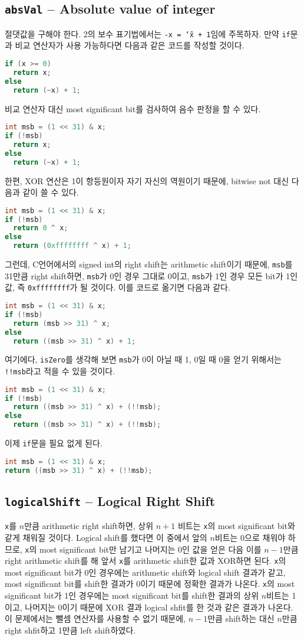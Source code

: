 \documentclass{scrartcl}
\begin{document}
\subsection{\texttt{absVal} -- Absolute value of integer}
절댓값을 구해야 한다. 2의 보수 표기법에서는 \texttt{-x = \char`\~x + 1}임에
주목하자. 만약 \texttt{if}문과 비교 연산자가 사용 가능하다면 다음과 같은 코드를 작성할
것이다.
\begin{lstlisting}[language=C]
if (x >= 0)
  return x;
else
  return (~x) + 1;
\end{lstlisting}
비교 연산자 대신 most significant bit를 검사하여 음수 판정을 할 수 있다.
\begin{lstlisting}[language=C]
int msb = (1 << 31) & x;
if (!msb)
  return x;
else
  return (~x) + 1;
\end{lstlisting}
한편, XOR 연산은 1이 항등원이자 자기 자신의 역원이기 때문에, bitwise not 대신
다음과 같이 쓸 수 있다.
\begin{lstlisting}[language=C]
int msb = (1 << 31) & x;
if (!msb)
  return 0 ^ x;
else
  return (0xffffffff ^ x) + 1;
\end{lstlisting}
그런데, C언어에서의 signed int의 right shift는 arithmetic shift이기 때문에,
\texttt{msb}를 31만큼 right shift하면, \texttt{msb}가 0인 경우 그대로 0이고,
\texttt{msb}가 1인 경우 모든 bit가 1인 값, 즉 \texttt{0xffffffff}가 될 것이다.
이를 코드로 옮기면 다음과 같다.
\begin{lstlisting}[language=C]
int msb = (1 << 31) & x;
if (!msb)
  return (msb >> 31) ^ x;
else
  return ((msb >> 31) ^ x) + 1;
\end{lstlisting}
여기에다, \texttt{isZero}를 생각해 보면 \texttt{msb}가 0이 아닐 때 1, 0일 때
0을 얻기 위해서는 \texttt{!!msb}라고 적을 수 있을 것이다.
\begin{lstlisting}[language=C]
int msb = (1 << 31) & x;
if (!msb)
  return ((msb >> 31) ^ x) + (!!msb);
else
  return ((msb >> 31) ^ x) + (!!msb);
\end{lstlisting}
이제 \texttt{if}문을 필요 없게 된다.
\begin{lstlisting}[language=C]
int msb = (1 << 31) & x;
return ((msb >> 31) ^ x) + (!!msb);
\end{lstlisting}

\subsection{\texttt{logicalShift} -- Logical Right Shift}
\texttt{x}를 \(n\)만큼 arithmetic right shift하면, 상위 \(n + 1\) 비트는
\texttt{x}의 most significant bit와 같게 채워질 것이다. Logical shift를 했다면
이 중에서 앞의 \(n\)비트는 0으로 채워야 하므로, \texttt{x}의 most significant
bit만 남기고 나머지는 0인 값을 얻은 다음 이를 \(n - 1\)만큼 right arithmetic
shift를 해 앞서 \texttt{x}를 arithmetic shift한 값과 XOR하면 된다. \texttt{x}의
most significant bit가 0인 경우에는 arithmetic shift와 logical shift 결과가
같고, most significant bit를 shift한 결과가 0이기 때문에 정확한 결과가 나온다.
\texttt{x}의 most significant bit가 1인 경우에는 most significant bit를 shift한
결과의 상위 \(n\)비트는 1이고, 나머지는 0이기 때문에 XOR 결과 logical shfit를
한 것과 같은 결과가 나온다. 이 문제에서는 뺄셈 연산자를 사용할 수 없기 때문에,
\(n - 1\)만큼 shift하는 대신 \(n\)만큼 right shfit하고 1만큼 left shift하였다.
\end{document}
